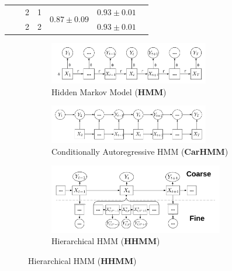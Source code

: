 \begin{table}[ht]
{\begin{tabular}{ccccccc}
                            &                                    & 2                             & 1                                & \multirow{2}{*}{$0.87 \pm 0.09$}    & $0.93 \pm 0.01$                       \\ 
                            &                                    & 2                             & 2                                &                                   & $0.93 \pm 0.01$                       \\ \hline
\end{tabular}
}

\label{table:accuracy}
\end{table}


\begin{figure}[ht]
    \begin{subfigure}{\textwidth}
      \centering
      \includegraphics[width=2.75in]{../Plots/HMM.png}  
      \caption{Hidden Markov Model (\textbf{HMM})}
      \label{fig:HMM}
    \end{subfigure}
    \newline
    \begin{subfigure}{\textwidth}
      \centering
      \includegraphics[width=2.75in]{../Plots/CarHMM.png}  
      \caption{Conditionally Autoregressive HMM (\textbf{CarHMM})}
      \label{fig:CarHMM}
    \end{subfigure}
    \newline
    \begin{subfigure}{\textwidth}
      \centering
      \includegraphics[width=3in]{../Plots/HHMM.png}  
      \caption{Hierarchical HMM (\textbf{HHMM})}
      \label{fig:HHMM}
    \end{subfigure}

\end{figure}
